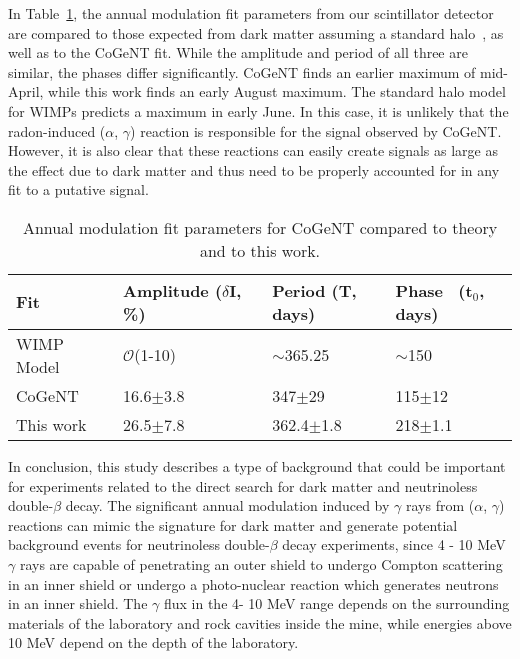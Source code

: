 \documentclass[aps,prc,showpacs,twocolumn,superscriptaddress]{revtex4-1}
\begin{document}
In Table~\ref{com}, the annual modulation fit parameters from our scintillator detector are  compared to those expected from dark matter assuming a standard halo~\cite{kat}, as well as to the CoGeNT fit. While the amplitude and period of all three are similar, the phases differ significantly. CoGeNT finds an earlier maximum of mid-April, while this work finds an early August maximum.  The standard halo model for WIMPs predicts a maximum in early June. In this case, it is unlikely that the radon-induced ($\alpha$, $\gamma$) reaction is responsible for the signal observed by CoGeNT.  However, it is also clear that these reactions can easily create signals as large as the effect due to dark matter and thus need to be properly accounted for in any fit to a putative signal.  
\begin{table}[H]
\centering
\begin{tabular}{m{1.8cm}| m{2.0cm} |  m{1.9cm}| m{2.0cm} }
\hline
    \toprule 
 	Fit&Amplitude  ($\delta$I, \%)~ &Period \hspace{0.8cm} (T, days)&Phase ~\hspace{1.0cm}(t$_{0}$, days) \\
    \midrule
    \hline
    \vspace{0.1cm}
    WIMP Model~\cite{kat} & $\mathcal{O}$(1-10)&$\sim$365.25& $\sim$150\\	\hline
   \vspace{0.1cm}
 	CoGeNT & 16.6$\pm$3.8& 347$\pm$29& 115$\pm$12\\ 
	\hline 
    \vspace{0.1cm}	
    This work & 26.5$\pm$7.8 & 362.4$\pm$1.8& 218$\pm$1.1\\ 
    \hline
	\bottomrule
	\hline
\end{tabular}
\caption{Annual modulation fit parameters for CoGeNT compared to theory and to this work.}
\label{com}
\end{table}
In conclusion, this study describes a type of background that could be important for experiments related to the direct search for dark matter and neutrinoless double-$\beta$ decay. The significant annual modulation induced by $\gamma$ rays from ($\alpha$, $\gamma$) reactions can mimic the signature for dark matter and generate potential background events for neutrinoless double-$\beta$ decay experiments, since 4 - 10 MeV $\gamma$ rays are capable of penetrating an outer shield to undergo Compton scattering in an inner shield or undergo a photo-nuclear reaction which generates neutrons in an inner shield.  The $\gamma$ flux in the 4- 10 MeV range depends on the surrounding materials of the laboratory and rock cavities inside the mine, while energies above 10 MeV depend on the depth of the laboratory. 
\end{document}
